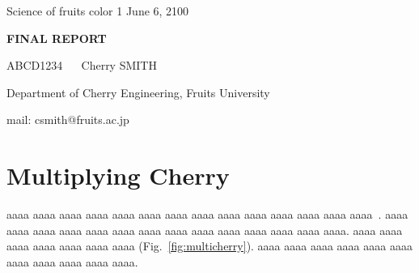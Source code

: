 \documentclass[dvipdfmx,a4j,11pt]{article}
\begin{document}
%
%
%
\noindent
\begin{flushleft} 
\large
Science of fruits color 1    %
\hspace{\fill}
June 6, 2100    %

\end{flushleft}
\begin{center} 
\LARGE 
\bf
{\Huge F}INAL {\Huge R}EPORT    %

\vspace{0.3cm} 
\large \rm
ABCD1234 ~~    %
Cherry SMITH    %
    
Department of Cherry Engineering, Fruits University	%
    
mail: csmith@fruits.ac.jp	%

\end{center}
\normalsize
\vspace{0.5cm} 
%
%
%
\section{Multiplying Cherry}
%
%
% 
aaaa aaaa aaaa aaaa aaaa aaaa aaaa 
aaaa aaaa aaaa aaaa aaaa aaaa aaaa~\cite{orange}. 
aaaa aaaa aaaa aaaa aaaa aaaa aaaa 
aaaa aaaa aaaa aaaa aaaa aaaa aaaa. 
aaaa aaaa aaaa aaaa aaaa aaaa aaaa (Fig.~\ref{fig:multicherry}). 
aaaa aaaa aaaa aaaa aaaa aaaa aaaa 
aaaa aaaa aaaa aaaa.

\end{document}
